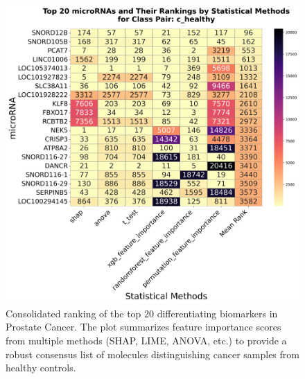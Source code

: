 \documentclass[journal]{IEEEtran}
\begin{document}
\begin{figure}[htbp]
\centering
\includegraphics[width=1\linewidth]{prostate_cancer_figures/summary/summary_of_statistical_methods_plot.png}
\caption{Consolidated ranking of the top 20 differentiating biomarkers in Prostate Cancer. The plot summarizes feature importance scores from multiple methods (SHAP, LIME, ANOVA, etc.) to provide a robust consensus list of molecules distinguishing cancer samples from healthy controls.}
\label{fig:prostate_biomarker_summary}
\end{figure}
\end{document}
